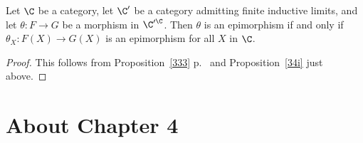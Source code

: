 \documentclass[12pt]{article}
\theoremstyle{remark}
\theoremstyle{definition}
\begin{document}
\begin{cor}
Let $\C$ be a category, let $\C'$ be a category admitting finite inductive limits, and let $\theta:F\to G$ be a morphism in $\C'^\C$. Then $\theta$ is an epimorphism if and only if $\theta_X:F(X)\to G(X)$ is an epimorphism for all $X$ in $\C$. 
\end{cor} 

\begin{proof}
This follows from Proposition~\ref{333} p.~ and Proposition~\ref{34i} just above.
\end{proof}


\section{About Chapter 4}
\end{document}
